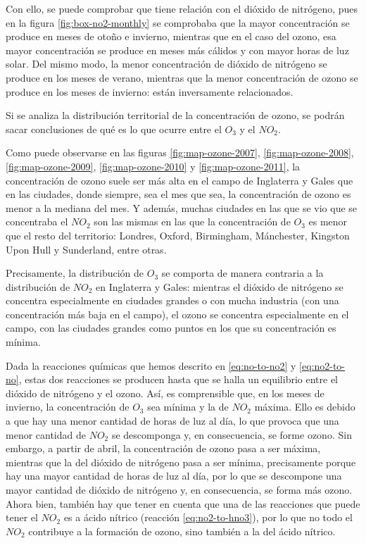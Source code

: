 \documentclass[12pt]{article}
\begin{document}
Con ello, se puede comprobar que tiene relación con el dióxido de nitrógeno, pues en la figura \ref{fig:box-no2-monthly} se comprobaba que la mayor concentración se produce en meses de otoño e invierno, mientras que en el caso del ozono, esa mayor concentración se produce en meses más cálidos y con mayor horas de luz solar. Del mismo modo, la menor concentración de dióxido de nitrógeno se produce en los meses de verano, mientras que la menor concentración de ozono se produce en los meses de invierno: están inversamente relacionados.

Si se analiza la distribución territorial de la concentración de ozono, se podrán sacar conclusiones de qué es lo que ocurre entre el $O_{3}$ y el $NO_{2}$.

Como puede observarse en las figuras \ref{fig:map-ozone-2007}, \ref{fig:map-ozone-2008}, \ref{fig:map-ozone-2009}, \ref{fig:map-ozone-2010} y \ref{fig:map-ozone-2011}, la concentración de ozono suele ser más alta en el campo de Inglaterra y Gales que en las ciudades, donde siempre, sea el mes que sea, la concentración de ozono es menor a la mediana del mes. Y además, muchas ciudades en las que se vio que se concentraba el $NO_{2}$ son las mismas en las que la concentración de $O_{3}$ es menor que el resto del territorio: Londres, Oxford, Birmingham, Mánchester, Kingston Upon Hull y Sunderland, entre otras.

Precisamente, la distribución de $O_{3}$ se comporta de manera contraria a la distribución de $NO_{2}$ en Inglaterra y Gales: mientras el dióxido de nitrógeno se concentra especialmente en ciudades grandes o con mucha industria (con una concentración más baja en el campo), el ozono se concentra especialmente en el campo, con las ciudades grandes como puntos en los que su concentración es mínima.

Dada la reacciones químicas que hemos descrito en \ref{eq:no-to-no2} y \ref{eq:no2-to-no}, estas dos reacciones se producen hasta que se halla un equilibrio entre el dióxido de nitrógeno y el ozono. Así, es comprensible que, en los meses de invierno, la concentración de $O_{3}$ sea mínima y la de $NO_{2}$ máxima. Ello es debido a que hay una menor cantidad de horas de luz al día, lo que provoca que una menor cantidad de $NO_{2}$ se descomponga y, en consecuencia, se forme ozono. Sin embargo, a partir de abril, la concentración de ozono pasa a ser máxima, mientras que la del dióxido de nitrógeno pasa a ser mínima, precisamente porque hay una mayor cantidad de horas de luz al día, por lo que se descompone una mayor cantidad de dióxido de nitrógeno y, en consecuencia, se forma más ozono. Ahora bien, también hay que tener en cuenta que una de las reacciones que puede tener el $NO_{2}$ es a ácido nítrico (reacción \ref{eq:no2-to-hno3}), por lo que no todo el $NO_{2}$ contribuye a la formación de ozono, sino también a la del ácido nítrico.
\end{document}
